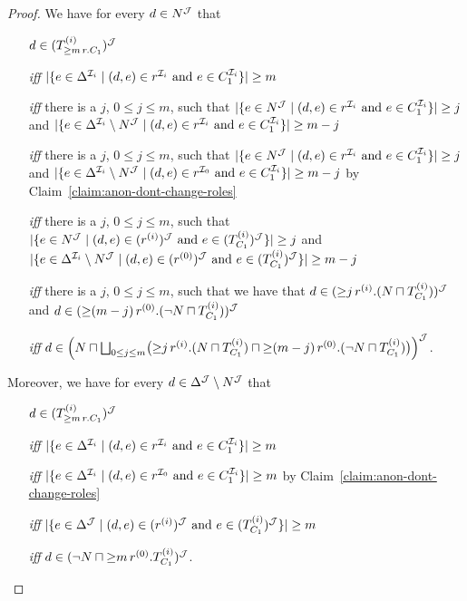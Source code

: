 \begin{proof}
    \noindent
    We have for every $d\in N^\mathcal{J}$ that
    \begin{itemize}
        \item[]
            $d\in(T_{{\ge}m\,r.C_1}^{(i)})^\mathcal{J}$
        \item[\emph{iff}]
            $\lvert\{e\in\Delta^{\mathcal{I}_i}\mid\text{$(d,e)\in r^{\mathcal{I}_i}$ and $e\in C_1^{\mathcal{I}_i}$}\}\rvert\ge m$
        \item[\emph{iff}]
            there is a $j$, $0\le j\le m$, such that
            $\lvert\{e\in N^\mathcal{J}\mid\text{$(d,e)\in r^{\mathcal{I}_i}$ and $e\in C_1^{\mathcal{I}_i}$}\}\rvert\ge j$ and
            $\lvert\{e\in\Delta^{\mathcal{I}_i}\setminus N^\mathcal{J}\mid\text{$(d,e)\in r^{\mathcal{I}_i}$ and $e\in C_1^{\mathcal{I}_i}$}\}\rvert\ge m-j$
        \item[\emph{iff}]
            there is a $j$, $0\le j\le m$, such that
            $\lvert\{e\in N^\mathcal{J}\mid\text{$(d,e)\in r^{\mathcal{I}_i}$ and $e\in C_1^{\mathcal{I}_i}$}\}\rvert\ge j$ and
            $\lvert\{e\in\Delta^{\mathcal{I}_i}\setminus N^\mathcal{J}\mid\text{$(d,e)\in r^{\mathcal{I}_0}$ and $e\in C_1^{\mathcal{I}_i}$}\}\rvert\ge m-j$
            by Claim~\ref{claim:anon-dont-change-roles}
        \item[\emph{iff}]
            there is a $j$, $0\le j\le m$, such that
            $\lvert\{e\in N^\mathcal{J}\mid\text{$(d,e)\in(r^{(i)})^\mathcal{J}$ and $e\in(T_{C_1}^{(i)})^\mathcal{J}$}\}\rvert\ge j$ and
            $\lvert\{e\in\Delta^{\mathcal{I}_i}\setminus N^\mathcal{J}\mid\text{$(d,e)\in(r^{(0)})^\mathcal{J}$ and $e\in(T_{C_1}^{(i)})^\mathcal{J}$}\}\rvert\ge m-j$
        \item[\emph{iff}]
            there is a $j$, $0\le j\le m$, such that we have that
            $d\in({\ge}j\,r^{(i)}.(N\sqcap T_{C_1}^{(i)}))^\mathcal{J}$ and
            $d\in({\ge}(m-j)\,r^{(0)}.(\lnot N\sqcap T_{C_1}^{(i)}))^\mathcal{J}$
        \item[\emph{iff}]
            $d\in\Bigl(N\sqcap\bigsqcup_{0\le j\le m}\bigl(%
                \atLeast{j}{r^{(i)}}{(N\sqcap T_{C_1}^{(i)})}\sqcap%
                \atLeast{(m-j)}{r^{(0)}}{(\lnot N\sqcap T_{C_1}^{(i)})}\bigr)\Bigr)^\Jmc$.
    \end{itemize}

    \noindent
    Moreover, we have for every $d\in\Delta^\mathcal{J}\setminus N^\mathcal{J}$ that
    \begin{itemize}
        \item[]
            $d\in(T_{{\ge}m\,r.C_1}^{(i)})^\mathcal{J}$
        \item[\emph{iff}]
            $\lvert\{e\in\Delta^{\mathcal{I}_i}\mid\text{$(d,e)\in r^{\mathcal{I}_i}$ and $e\in C_1^{\mathcal{I}_i}$}\}\rvert\ge m$
        \item[\emph{iff}]
            $\lvert\{e\in\Delta^{\mathcal{I}_i}\mid\text{$(d,e)\in r^{\mathcal{I}_0}$ and $e\in C_1^{\mathcal{I}_i}$}\}\rvert\ge m$
            by Claim~\ref{claim:anon-dont-change-roles}
        \item[\emph{iff}]
            $\lvert\{e\in\Delta^\mathcal{J}\mid\text{$(d,e)\in(r^{(i)})^\mathcal{J}$ and $e\in(T_{C_1}^{(i)})^\mathcal{J}$}\}\rvert\ge m$
        \item[\emph{iff}]
            $d\in(\lnot N\sqcap{\ge}m\,r^{(0)}.T_{C_1}^{(i)})^\mathcal{J}$.
    \end{itemize}


\end{proof}

